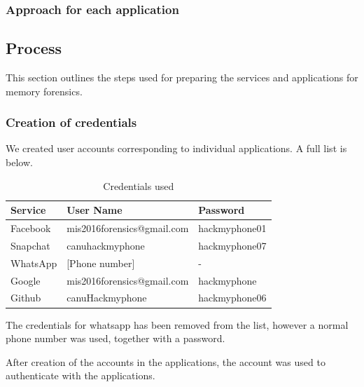\subsubsection*{Approach for each application}
\subsection{Process} %
This section outlines the steps used for preparing the services and applications for memory forensics.

\subsubsection{Creation of credentials}
We created user accounts corresponding to individual applications. A full list is below.\\
\begin{table}
\begin{tabular}{l|l|l}
Service & User Name & Password \\ 
\hline 
Facebook & mis2016forensics@gmail.com & hackmyphone01 \\ 
Snapchat & canuhackmyphone & hackmyphone07 \\ 
WhatsApp & [Phone number] & - \\ 
Google & mis2016forensics@gmail.com & hackmyphone \\ 
Github & canuHackmyphone & hackmyphone06 \\ 
\end{tabular} 
\caption{Credentials used}
\label{tbl:credentials}
\end{table}

The credentials for whatsapp has been removed from the list, however a normal phone number was used, together with a password.

After creation of the accounts in the applications, the account was used to authenticate with the applications.


